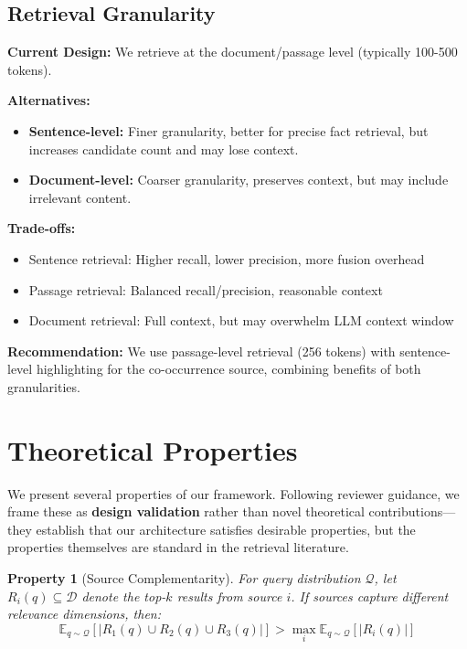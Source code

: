 \documentclass[11pt,a4paper]{article}
\newtheorem{property}{Property}
\begin{document}
\subsection{Retrieval Granularity}
\label{sec:granularity}

\textbf{Current Design:} We retrieve at the document/passage level (typically 100-500 tokens).

\textbf{Alternatives:}
\begin{itemize}
    \item \textbf{Sentence-level:} Finer granularity, better for precise fact retrieval, but increases candidate count and may lose context.
    \item \textbf{Document-level:} Coarser granularity, preserves context, but may include irrelevant content.
\end{itemize}

\textbf{Trade-offs:}
\begin{itemize}
    \item Sentence retrieval: Higher recall, lower precision, more fusion overhead
    \item Passage retrieval: Balanced recall/precision, reasonable context
    \item Document retrieval: Full context, but may overwhelm LLM context window
\end{itemize}

\textbf{Recommendation:} We use passage-level retrieval (256 tokens) with sentence-level highlighting for the co-occurrence source, combining benefits of both granularities.

\section{Theoretical Properties}
\label{sec:properties}

We present several properties of our framework. Following reviewer guidance, we frame these as \textbf{design validation} rather than novel theoretical contributions---they establish that our architecture satisfies desirable properties, but the properties themselves are standard in the retrieval literature.

\begin{property}[Source Complementarity]
\label{prop:complementarity}
For query distribution $\mathcal{Q}$, let $R_i(q) \subseteq \mathcal{D}$ denote the top-$k$ results from source $i$. If sources capture different relevance dimensions, then:
\begin{equation}
\mathbb{E}_{q \sim \mathcal{Q}}\left[|R_1(q) \cup R_2(q) \cup R_3(q)|\right] > \max_i \mathbb{E}_{q \sim \mathcal{Q}}\left[|R_i(q)|\right]
\end{equation}
\end{property}
\end{document}
